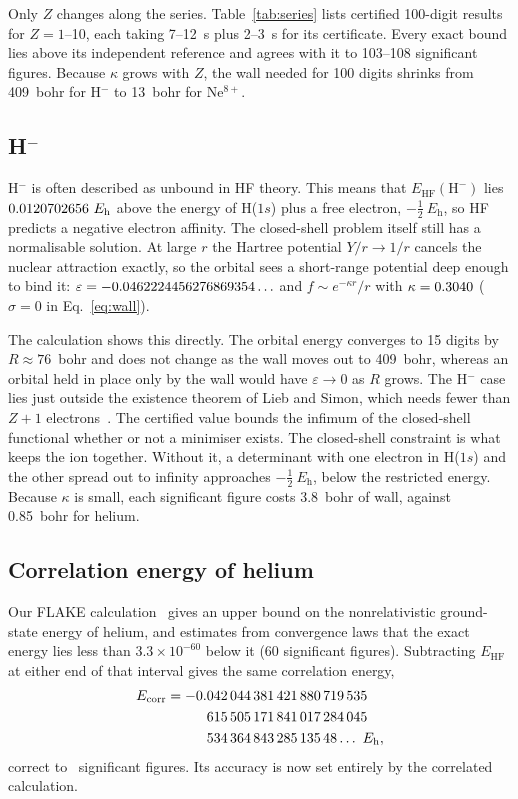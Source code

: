 \documentclass[aps,pra,reprint,superscriptaddress,amsmath,amssymb,longbibliography]{revtex4-2}
\newcommand{\eh}{E_\mathrm{h}}
\newcommand{\EHF}{E_\mathrm{HF}}
\begin{document}
Only $Z$ changes along the series. Table~\ref{tab:series} lists certified 100-digit results for $Z=1$--10, each taking 7--12~s plus 2--3~s for its certificate. Every exact bound lies above its independent reference and agrees with it to 103--108 significant figures. Because $\kappa$ grows with $Z$, the wall needed for 100 digits shrinks from 409~bohr for H$^-$ to 13~bohr for Ne$^{8+}$.

\subsection{H$^-$}\label{sec:hminus}

H$^-$ is often described as unbound in HF theory. This means that $\EHF(\mathrm{H}^-)$ lies $\EAH\ \eh$ above the energy of H($1s$) plus a free electron, $-\tfrac12\ \eh$, so HF predicts a negative electron affinity. The closed-shell problem itself still has a normalisable solution. At large $r$ the Hartree potential $Y/r\to1/r$ cancels the nuclear attraction exactly, so the orbital sees a short-range potential deep enough to bind it: $\varepsilon=-0.0462224456276869354\ldots$ and $f\sim e^{-\kappa r}/r$ with $\kappa=0.3040$ ($\sigma=0$ in Eq.~\eqref{eq:wall}).

The calculation shows this directly. The orbital energy converges to 15 digits by $R\approx76$~bohr and does not change as the wall moves out to 409~bohr, whereas an orbital held in place only by the wall would have $\varepsilon\to0$ as $R$ grows. The H$^-$ case lies just outside the existence theorem of Lieb and Simon, which needs fewer than $Z+1$ electrons~\cite{LiebSimon1977}. The certified value bounds the infimum of the closed-shell functional whether or not a minimiser exists. The closed-shell constraint is what keeps the ion together. Without it, a determinant with one electron in H($1s$) and the other spread out to infinity approaches $-\tfrac12\ \eh$, below the restricted energy. Because $\kappa$ is small, each significant figure costs 3.8~bohr of wall, against 0.85~bohr for helium.

\subsection{Correlation energy of helium}

Our FLAKE calculation~\cite{FLAKE} gives an upper bound on the nonrelativistic ground-state energy of helium, and estimates from convergence laws that the exact energy lies less than $3.3\times10^{-60}$ below it (60 significant figures). Subtracting $\EHF$ at either end of that interval gives the same correlation energy,
\begin{equation}
\begin{split}
E_\mathrm{corr}={}&\Ecorrsplit\ldots\ \eh,
\end{split}\label{eq:ecorr}
\end{equation}
correct to \Ncorr\ significant figures. Its accuracy is now set entirely by the correlated calculation.
\end{document}
